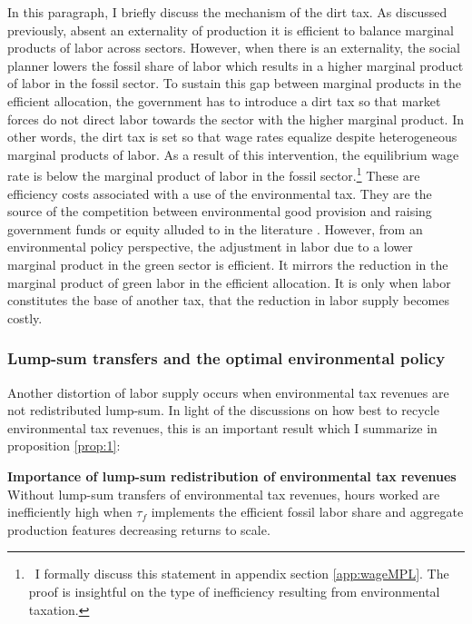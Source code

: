 In this paragraph, I briefly discuss the mechanism of the dirt tax.
As discussed previously, absent an externality of production it is efficient to balance marginal products of labor across sectors. However, when there is an externality, the social planner lowers the fossil share of labor which results in a higher marginal product of labor in the fossil sector. To sustain this gap between marginal products in the efficient allocation, the government has to introduce a dirt tax so that market forces do not direct labor towards the sector with the higher marginal product. In other words, the dirt tax is set so that wage rates equalize despite heterogeneous marginal products of labor. As a result of this intervention, the equilibrium wage rate is below the marginal product of labor in the fossil sector.\footnote{\ I formally discuss this statement in appendix section \ref{app:wageMPL}. The proof is insightful on the type of inefficiency resulting from environmental taxation. } These are efficiency costs associated with a use of the environmental tax. They are the source of the competition between environmental good provision and raising government funds or equity alluded to in the literature \citep[e.g.][]{LansBovenberg1994EnvironmentalTaxation}.  
However, from an environmental policy perspective, the adjustment in labor due to a lower marginal product in the green sector is efficient. It mirrors the reduction in the marginal product of green labor in the efficient allocation. It is only when labor constitutes the base of another tax, that the reduction in labor supply becomes costly. 
\subsubsection{Lump-sum transfers and the optimal environmental policy}\label{subsec:nolump}

Another distortion of labor supply occurs when environmental tax revenues are not redistributed lump-sum.
In light of the discussions on how best to recycle environmental tax revenues, this is an important result which I summarize in proposition \ref{prop:1}:

\begin{prop}\label{prop:1}\textbf{Importance of lump-sum redistribution of environmental tax revenues}
	Without lump-sum transfers of environmental tax revenues, hours worked are inefficiently high when $\tau_{f}$ implements the efficient fossil labor share and aggregate production features decreasing returns to scale.
\end{prop}


